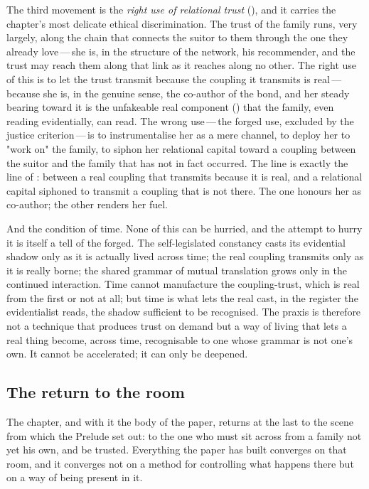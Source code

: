 The third movement is the \emph{right use of relational trust} (), and it carries the chapter's most delicate ethical discrimination. The trust of the family runs, very largely, along the chain that connects the suitor to them through the one they already love\,---\,she is, in the structure of the network, his recommender, and the trust may reach them along that link as it reaches along no other. The right use of this is to let the trust transmit because the coupling it transmits is real\,---\,because she is, in the genuine sense, the co-author of the bond, and her steady bearing toward it is the unfakeable real component () that the family, even reading evidentially, can read. The wrong use\,---\,the forged use, excluded by the justice criterion\,---\,is to instrumentalise her as a mere channel, to deploy her to "work on" the family, to siphon her relational capital toward a coupling between the suitor and the family that has not in fact occurred. The line is exactly the line of : between a real coupling that transmits because it is real, and a relational capital siphoned to transmit a coupling that is not there. The one honours her as co-author; the other renders her fuel.

And the condition of time. None of this can be hurried, and the attempt to hurry it is itself a tell of the forged. The self-legislated constancy casts its evidential shadow only as it is actually lived across time; the real coupling transmits only as it is really borne; the shared grammar of mutual translation grows only in the continued interaction. Time cannot manufacture the coupling-trust, which is real from the first or not at all; but time is what lets the real cast, in the register the evidentialist reads, the shadow sufficient to be recognised. The praxis is therefore not a technique that produces trust on demand but a way of living that lets a real thing become, across time, recognisable to one whose grammar is not one's own. It cannot be accelerated; it can only be deepened.

\subsection{The return to the room}
\label{p13:sub:prax-room}

The chapter, and with it the body of the paper, returns at the last to the scene from which the Prelude set out: to the one who must sit across from a family not yet his own, and be trusted. Everything the paper has built converges on that room, and it converges not on a method for controlling what happens there but on a way of being present in it.

